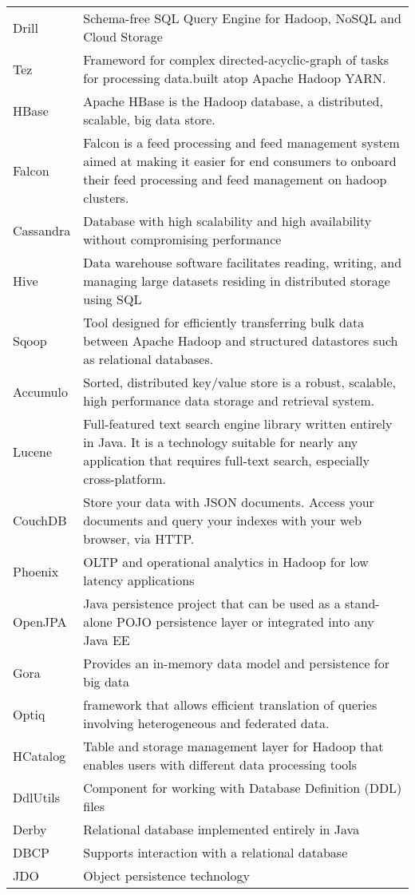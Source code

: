 {\begin{longtable}{|p{2cm} | p{14cm}|}
Drill & Schema-free SQL Query Engine for Hadoop, NoSQL and Cloud Storage
\\ Tez & Frameword for complex directed-acyclic-graph of tasks for processing data.built atop Apache Hadoop YARN.
\\ HBase & Apache HBase is the Hadoop database, a distributed, scalable, big data store.
\\ Falcon & Falcon is a feed processing and feed management system aimed at making it easier for end consumers to onboard their feed processing and feed management on hadoop clusters.
\\ Cassandra & Database with high scalability and high availability without compromising performance
\\ Hive & Data warehouse software facilitates reading, writing, and managing large datasets residing in distributed storage using SQL
\\ Sqoop & Tool designed for efficiently transferring bulk data between Apache Hadoop and structured datastores such as relational databases.
\\ Accumulo & Sorted, distributed key/value store is a robust, scalable, high performance data storage and retrieval system.
\\ Lucene & Full-featured text search engine library written entirely in Java. It is a technology suitable for nearly any application that requires full-text search, especially cross-platform.
\\ CouchDB & Store your data with JSON documents. Access your documents and query your indexes with your web browser, via HTTP.
\\ Phoenix &  OLTP and operational analytics in Hadoop for low latency applications
\\ OpenJPA & Java persistence project that can be used as a stand-alone POJO persistence layer or integrated into any Java EE
\\ Gora & Provides an in-memory data model and persistence for big data
\\ Optiq & framework that allows efficient translation of queries involving heterogeneous and federated data.
\\ HCatalog & Table and storage management layer for Hadoop that enables users with different data processing tools
\\ DdlUtils &  Component for working with Database Definition (DDL) files
\\ Derby & Relational database implemented entirely in Java
\\ DBCP & Supports interaction with a relational database
\\ JDO & Object persistence technology \\


\end{longtable}}
